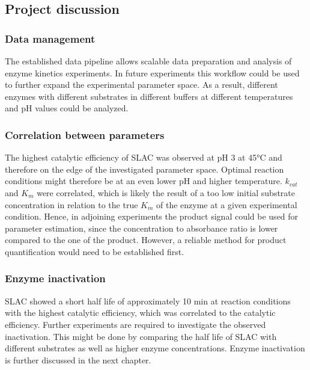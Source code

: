 \documentclass[letterpaper,12pt,english]{jupyterBook}
\begin{document}
\subsection{Project discussion}
\label{\detokenize{scenarios/SLAC_kinetic_characterization:project-discussion}}

\subsubsection{Data management}
\label{\detokenize{scenarios/SLAC_kinetic_characterization:id5}}
\sphinxAtStartPar
The established data pipeline allows scalable data preparation and analysis of enzyme kinetics experiments. In future experiments this workflow could be used to further expand the experimental parameter space. As a result, different enzymes with different substrates in different buffers at different temperatures and pH values could be analyzed.


\subsubsection{Correlation between parameters}
\label{\detokenize{scenarios/SLAC_kinetic_characterization:correlation-between-parameters}}
\sphinxAtStartPar
The highest catalytic efficiency of SLAC was observed at pH 3 at 45°C and therefore on the edge of the investigated parameter space. Optimal reaction conditions might therefore be at an even lower pH and higher temperature. \(k_{cat}\) and \(K_{m}\) were correlated, which is likely the result of a too low initial substrate concentration in relation to the true \(K_{m}\) of the enzyme at a given experimental condition. Hence, in adjoining experiments the product signal could be used for parameter estimation, since the concentration to absorbance ratio is lower compared to the one of the product. However, a reliable method for product quantification would need to be established first.


\subsubsection{Enzyme inactivation}
\label{\detokenize{scenarios/SLAC_kinetic_characterization:enzyme-inactivation}}
\sphinxAtStartPar
SLAC showed a short half life of approximately 10 min at reaction conditions with the highest catalytic efficiency, which was correlated to the catalytic efficiency. Further experiments are required to investigate the observed inactivation. This might be done by comparing the half life of SLAC with different substrates as well as higher enzyme concentrations. Enzyme inactivation is further discussed in the next chapter.
\end{document}

